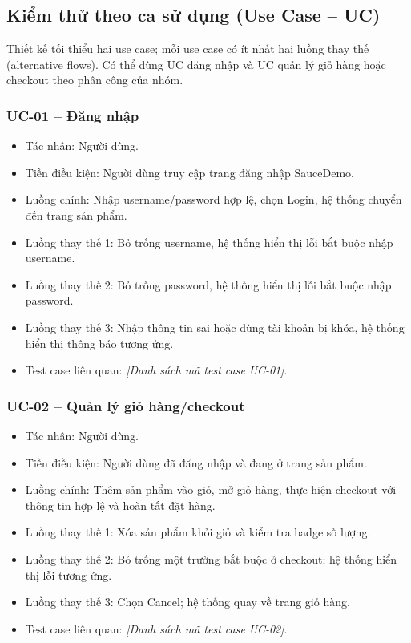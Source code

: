 \documentclass[a4paper,12pt]{article}
\newcommand{\fillin}[1]{\textit{[#1]}}
\begin{document}
\subsection{Kiểm thử theo ca sử dụng (Use Case -- UC)}
Thiết kế tối thiểu hai use case; mỗi use case có ít nhất hai luồng thay thế (alternative flows). Có thể dùng UC đăng nhập và UC quản lý giỏ hàng hoặc checkout theo phân công của nhóm.

\subsubsection{UC-01 -- Đăng nhập}
\begin{itemize}
  \item Tác nhân: Người dùng.
  \item Tiền điều kiện: Người dùng truy cập trang đăng nhập SauceDemo.
  \item Luồng chính: Nhập username/password hợp lệ, chọn Login, hệ thống chuyển đến trang sản phẩm.
  \item Luồng thay thế 1: Bỏ trống username, hệ thống hiển thị lỗi bắt buộc nhập username.
  \item Luồng thay thế 2: Bỏ trống password, hệ thống hiển thị lỗi bắt buộc nhập password.
  \item Luồng thay thế 3: Nhập thông tin sai hoặc dùng tài khoản bị khóa, hệ thống hiển thị thông báo tương ứng.
  \item Test case liên quan: \fillin{Danh sách mã test case UC-01}.
\end{itemize}

\subsubsection{UC-02 -- Quản lý giỏ hàng/checkout}
\begin{itemize}
  \item Tác nhân: Người dùng.
  \item Tiền điều kiện: Người dùng đã đăng nhập và đang ở trang sản phẩm.
  \item Luồng chính: Thêm sản phẩm vào giỏ, mở giỏ hàng, thực hiện checkout với thông tin hợp lệ và hoàn tất đặt hàng.
  \item Luồng thay thế 1: Xóa sản phẩm khỏi giỏ và kiểm tra badge số lượng.
  \item Luồng thay thế 2: Bỏ trống một trường bắt buộc ở checkout; hệ thống hiển thị lỗi tương ứng.
  \item Luồng thay thế 3: Chọn Cancel; hệ thống quay về trang giỏ hàng.
  \item Test case liên quan: \fillin{Danh sách mã test case UC-02}.
\end{itemize}
\end{document}
